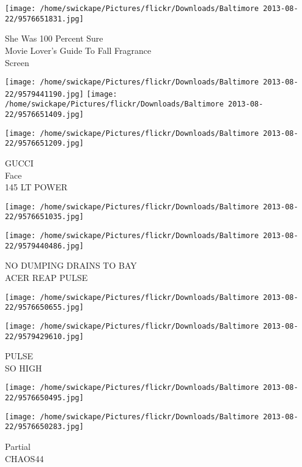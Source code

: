 \documentclass[10pt,letterpaper]{article}
\begin{document}
\vspace{0.25in}
\texttt{[image: /home/swickape/Pictures/flickr/Downloads/Baltimore 2013-08-22/9576651831.jpg]}

She Was 100 Percent Sure\\
Movie Lover's Guide To Fall Fragrance\\
Screen\\
\pagebreak

\texttt{[image: /home/swickape/Pictures/flickr/Downloads/Baltimore 2013-08-22/9579441190.jpg]}
\texttt{[image: /home/swickape/Pictures/flickr/Downloads/Baltimore 2013-08-22/9576651409.jpg]}

\texttt{[image: /home/swickape/Pictures/flickr/Downloads/Baltimore 2013-08-22/9576651209.jpg]}

GUCCI\\
Face\\
145 LT POWER\\
\pagebreak

\texttt{[image: /home/swickape/Pictures/flickr/Downloads/Baltimore 2013-08-22/9576651035.jpg]}

\vspace{0.25in}
\texttt{[image: /home/swickape/Pictures/flickr/Downloads/Baltimore 2013-08-22/9579440486.jpg]}

NO DUMPING DRAINS TO BAY\\
ACER REAP PULSE\\
\pagebreak

\texttt{[image: /home/swickape/Pictures/flickr/Downloads/Baltimore 2013-08-22/9576650655.jpg]}

\vspace{0.25in}
\texttt{[image: /home/swickape/Pictures/flickr/Downloads/Baltimore 2013-08-22/9579429610.jpg]}

PULSE\\
SO HIGH\\
\pagebreak

\texttt{[image: /home/swickape/Pictures/flickr/Downloads/Baltimore 2013-08-22/9576650495.jpg]}

\vspace{0.25in}
\texttt{[image: /home/swickape/Pictures/flickr/Downloads/Baltimore 2013-08-22/9576650283.jpg]}

Partial\\
CHAOS44\\
\pagebreak
\end{document}
